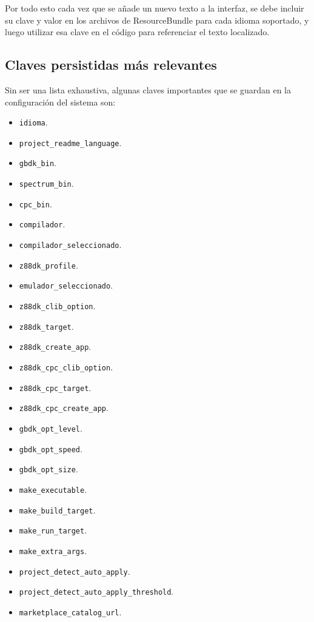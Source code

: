 \documentclass[../../main.tex]{subfiles}
\begin{document}
Por todo esto cada vez que se añade un nuevo texto a la interfaz, se debe incluir su clave y valor en los archivos de ResourceBundle para cada idioma soportado, y luego utilizar esa clave en el código para referenciar el texto localizado.

\clearpage

\subsection{Claves persistidas más relevantes}

Sin ser una lista exhaustiva, algunas claves importantes que se guardan en la configuración del sistema son:

\begin{itemize}
    \item \lstinline|idioma|.
    \item \lstinline|project_readme_language|.
    \item \lstinline|gbdk_bin|.
    \item \lstinline|spectrum_bin|.
    \item \lstinline|cpc_bin|.
    \item \lstinline|compilador|.
    \item \lstinline|compilador_seleccionado|.
    \item \lstinline|z88dk_profile|.
    \item \lstinline|emulador_seleccionado|.
    \item \lstinline|z88dk_clib_option|.
    \item \lstinline|z88dk_target|.
    \item \lstinline|z88dk_create_app|.
    \item \lstinline|z88dk_cpc_clib_option|.
    \item \lstinline|z88dk_cpc_target|.
    \item \lstinline|z88dk_cpc_create_app|.
    \item \lstinline|gbdk_opt_level|.
    \item \lstinline|gbdk_opt_speed|.
    \item \lstinline|gbdk_opt_size|.
    \item \lstinline|make_executable|.
    \item \lstinline|make_build_target|.
    \item \lstinline|make_run_target|.
    \item \lstinline|make_extra_args|.
    \item \lstinline|project_detect_auto_apply|.
    \item \lstinline|project_detect_auto_apply_threshold|.
    \item \lstinline|marketplace_catalog_url|.
\end{itemize}
\end{document}
